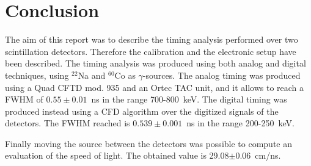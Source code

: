 \section*{Conclusion}
The aim of this report was to describe the timing analysis performed over two scintillation detectors. Therefore the calibration and the electronic setup have been described. The timing analysis was produced using both analog and digital techniques, using $^{22}$Na and $^{60}$Co as $\gamma$-sources. 
The analog timing was produced using a Quad CFTD mod. 935 and an Ortec TAC unit, and it allows to reach a FWHM of $0.55\pm0.01$~ns in the range 700-800~keV. The digital timing was produced instead using a CFD algorithm over the digitized signals of the detectors. The FWHM reached is $0.539\pm0.001$~ns in the range 200-250~keV. 

Finally moving the source between the detectors was possible to compute an evaluation of the speed of light. The obtained value is 29.08$\pm$0.06~cm/ns.